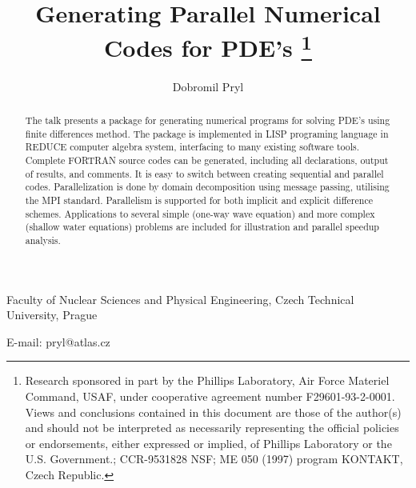 \documentclass{article}
\begin{document}
\title{Generating Parallel Numerical Codes for PDE's
 \thanks{Research sponsored in part by the Phillips Laboratory, Air Force Materiel  Command, USAF, under cooperative agreement
number F29601-93-2-0001. Views and conclusions contained in this document are those of the author(s) and should not be
interpreted as necessarily representing the official policies or endorsements, either expressed or implied, of Phillips Laboratory
or the U.S. Government.; 
CCR-9531828 NSF; 
ME 050 (1997) program KONTAKT, Czech Republic.}
}

\author{Dobromil Pryl}

\date{}

\maketitle

\begin{center}
Faculty of Nuclear Sciences and Physical Engineering,
 Czech Technical University, Prague
\end{center}
E-mail: pryl@atlas.cz

\begin{abstract}
The talk presents a package for generating numerical programs 
for solving PDE's using finite differences method.
The package is implemented in LISP programing language
in REDUCE computer algebra system, interfacing to many existing software tools.
Complete FORTRAN source codes can be generated,
including all declarations, output of results, and comments.
It is easy to switch between creating sequential and parallel codes.
Parallelization is done by domain decomposition using message passing, 
utilising the MPI standard.
Parallelism is supported for both implicit and explicit difference schemes.
Applications to several simple (one-way wave equation)
and more complex (shallow water equations) problems
are included for illustration and parallel speedup analysis.
\end{abstract}
\end{document}
